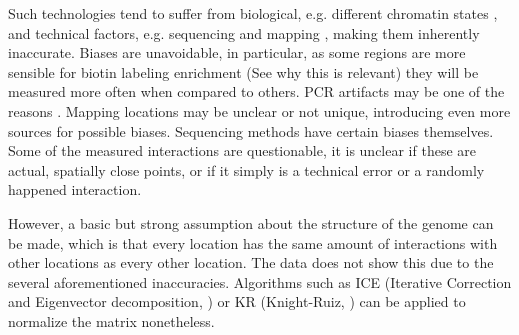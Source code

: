 Such technologies tend to suffer from biological, e.g. different chromatin
states \cite{pmid19693276}, and technical factors, e.g. sequencing and mapping
\cite{pmid21646344}, making them inherently inaccurate. Biases are unavoidable,
in particular, as some regions are more sensible for biotin labeling
enrichment (See  why this is relevant) they will be
measured more often when compared to others. PCR artifacts may be one of the
reasons \cite{wingett2015hicup}. Mapping locations may be unclear or not
unique, introducing even more sources for possible biases. Sequencing methods
have certain biases themselves. Some of the measured interactions are
questionable, it is unclear if these are actual, spatially close points, or if
it simply is a technical error or a randomly happened interaction.

However, a basic but strong assumption about the structure of the genome can be
made, which is that every location has the same amount of interactions with
other locations as every other location. The data does not show this due to
the several aforementioned inaccuracies. Algorithms such as ICE
\cite{imakaev2012iterative} (Iterative Correction and Eigenvector
decomposition, ) or KR \cite{knight2013fast} (Knight-Ruiz,
) can be applied to normalize the matrix nonetheless.




